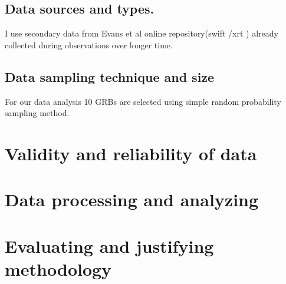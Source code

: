 \subsection{Data sources and types.}
I use secondary data from Evans et al online repository(swift /xrt ) already collected during observations over longer time.
\subsection{Data sampling technique and size}
For our data analysis 10 GRBs are  selected  using simple random probability sampling method. 
\section{Validity and reliability of data }
\section{Data processing and analyzing }
\section{Evaluating and justifying methodology}

 


